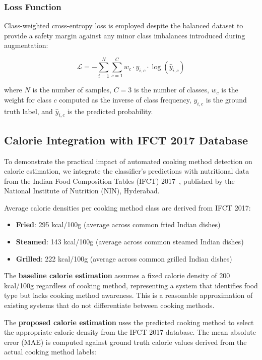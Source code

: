 \documentclass[journal]{IEEEtran}
\begin{document}
\subsubsection{Loss Function}

Class-weighted cross-entropy loss is employed despite the balanced dataset to provide a safety margin against any minor class imbalances introduced during augmentation:

\begin{equation}
    \mathcal{L} = -\sum_{i=1}^{N} \sum_{c=1}^{C} w_c \cdot y_{i,c} \cdot \log(\hat{y}_{i,c})
\end{equation}

\noindent where $N$ is the number of samples, $C=3$ is the number of classes, $w_c$ is the weight for class $c$ computed as the inverse of class frequency, $y_{i,c}$ is the ground truth label, and $\hat{y}_{i,c}$ is the predicted probability.

\subsection{Calorie Integration with IFCT 2017 Database}

To demonstrate the practical impact of automated cooking method detection on calorie estimation, we integrate the classifier's predictions with nutritional data from the Indian Food Composition Tables (IFCT) 2017~\cite{ifct2017}, published by the National Institute of Nutrition (NIN), Hyderabad.

Average calorie densities per cooking method class are derived from IFCT 2017:

\begin{itemize}
    \item \textbf{Fried}: 295 kcal/100g (average across common fried Indian dishes)
    \item \textbf{Steamed}: 143 kcal/100g (average across common steamed Indian dishes)
    \item \textbf{Grilled}: 222 kcal/100g (average across common grilled Indian dishes)
\end{itemize}

The \textbf{baseline calorie estimation} assumes a fixed calorie density of 200 kcal/100g regardless of cooking method, representing a system that identifies food type but lacks cooking method awareness. This is a reasonable approximation of existing systems that do not differentiate between cooking methods.

The \textbf{proposed calorie estimation} uses the predicted cooking method to select the appropriate calorie density from the IFCT 2017 database. The mean absolute error (MAE) is computed against ground truth calorie values derived from the actual cooking method labels:
\end{document}
